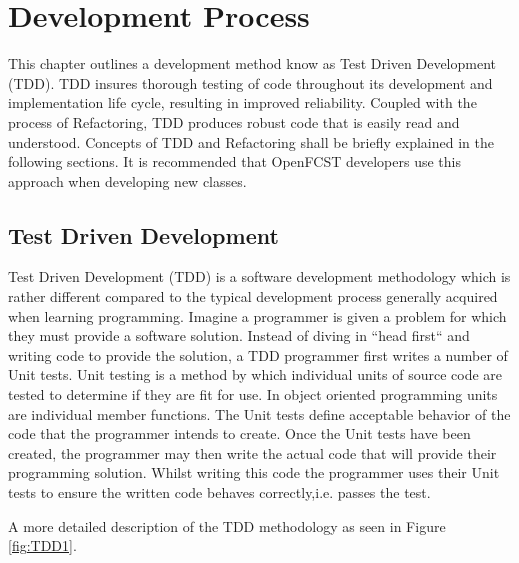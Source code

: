 \chapter{Development Process}

This chapter outlines a development method know as Test Driven Development (TDD). TDD insures thorough testing of code throughout its development and implementation life cycle, resulting in improved reliability. Coupled with the process of Refactoring, TDD produces robust code that is easily read and understood. Concepts of TDD and Refactoring shall be briefly explained in the following sections. It is recommended that OpenFCST developers use this approach when developing new classes.

\section{Test Driven Development}
    
Test Driven Development (TDD) is a software development methodology which is rather different compared to the typical development process generally acquired when learning programming. Imagine a programmer is given a problem for which they must provide a software solution. Instead of diving in ``head first`` and writing code to provide the solution, a TDD programmer first writes a number of Unit tests. Unit testing is a method by which individual units of source code are tested to determine if they are fit for use. In object oriented programming units are individual member functions.  The Unit tests define acceptable behavior of the code that the programmer intends to create. Once the Unit tests have been created, the programmer may then write the actual code that will provide their programming solution. Whilst writing this code the programmer uses their Unit tests to ensure the written code behaves correctly,i.e. passes the test.
     
A more detailed description of the TDD methodology as seen in Figure \ref{fig:TDD1}.

